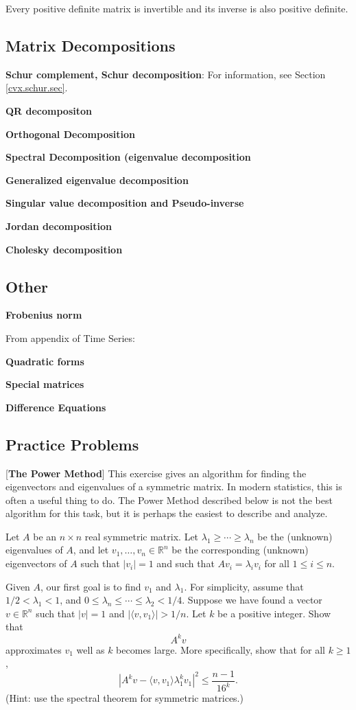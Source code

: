 Every positive definite matrix is invertible and its inverse is also positive definite.

\subsection{Matrix Decompositions}

\textbf{Schur complement, Schur decomposition}: For information, see Section \ref{cvx.schur.sec}.

\textbf{QR decompositon}

\textbf{Orthogonal Decomposition}

\textbf{Spectral Decomposition (eigenvalue decomposition}

\textbf{Generalized eigenvalue decomposition}

\textbf{Singular value decomposition and Pseudo-inverse}

\textbf{Jordan decomposition}

\textbf{Cholesky decomposition}

\subsection{Other}

\textbf{Frobenius norm}

From appendix of Time Series:

\textbf{Quadratic forms}

\textbf{Special matrices}

\textbf{Difference Equations}

\subsection{Practice Problems}

[\textbf{The Power Method}]
This exercise gives an algorithm for finding the eigenvectors and eigenvalues of a symmetric matrix.  In modern statistics, this is often a useful thing to do.  The Power Method described below is not the best algorithm for this task, but it is perhaps the easiest to describe and analyze.

Let $A$ be an $n\times n$ real symmetric matrix.  Let $\lambda_{1}\geq\cdots\geq\lambda_{n}$ be the (unknown) eigenvalues of $A$, and let $v_{1},\ldots,v_{n}\in\mathbb{R}^{n}$ be the corresponding (unknown) eigenvectors of $A$ such that $|v_{i}|=1$ and such that $A v_{i}=\lambda_{i}v_{i}$ for all $1\leq i\leq n$.

Given $A$, our first goal is to find $v_{1}$ and $\lambda_{1}$.  For simplicity, assume that $1/2<\lambda_{1}<1$, and $0\leq \lambda_{n}\leq\cdots\leq\lambda_{2}<1/4$.  Suppose we have found a vector $v\in\mathbb{R}^{n}$ such that $|v|=1$ and $|\langle v,v_{1}\rangle|>1/n$. Let $k$ be a positive integer.  Show that
$$A^{k}v$$
approximates $v_{1}$ well as $k$ becomes large.  More specifically, show that for all $k\geq1$,
$$|A^{k}v - \langle v,v_{1}\rangle\lambda_{1}^{k}v_{1}|^{2}\leq\frac{n-1}{16^{k}}.$$
(Hint: use the spectral theorem for symmetric matrices.)

